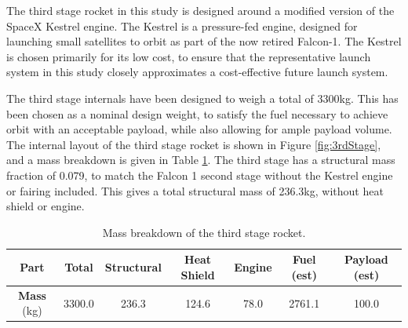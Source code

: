   The third stage rocket in this study is designed around a modified version of the SpaceX Kestrel engine. The Kestrel is a pressure-fed engine, designed for launching small satellites to orbit as part of the now retired Falcon-1. The Kestrel is chosen primarily for its low cost, to ensure that the representative launch system in this study closely approximates a cost-effective future launch system.  
  
  
 The third stage internals have been designed to weigh a total of 3300kg. This has been chosen as a nominal design weight, to satisfy the fuel necessary to achieve orbit with an acceptable payload, while also allowing for ample payload volume. The internal layout of the third stage rocket is shown in Figure \ref{fig:3rdStage}, and a mass breakdown is given in Table \ref{tab:MassBreakdown3}. The third stage has a structural mass fraction of 0.079, to match the Falcon 1 second stage without the Kestrel engine or fairing included\cite{Vehicle2008}. This gives a total structural mass of 236.3kg, without heat shield or engine. 
 

 
	\begin{table}[h]
		\centering
		\begin{tabular}{|c|c|c|c|c|c|c|}
			\hline  \textbf{Part} & Total & Structural & Heat Shield & Engine & Fuel (est) & Payload (est) \\ 
			\hline \textbf{Mass} (kg) & 3300.0  & 236.3  & 124.6  & 78.0  & 2761.1 & 100.0\\ 
			\hline 
		\end{tabular} 
		\caption{Mass breakdown of the third stage rocket.} %
		\label{tab:MassBreakdown3}
	\end{table}
 
 
 
 
